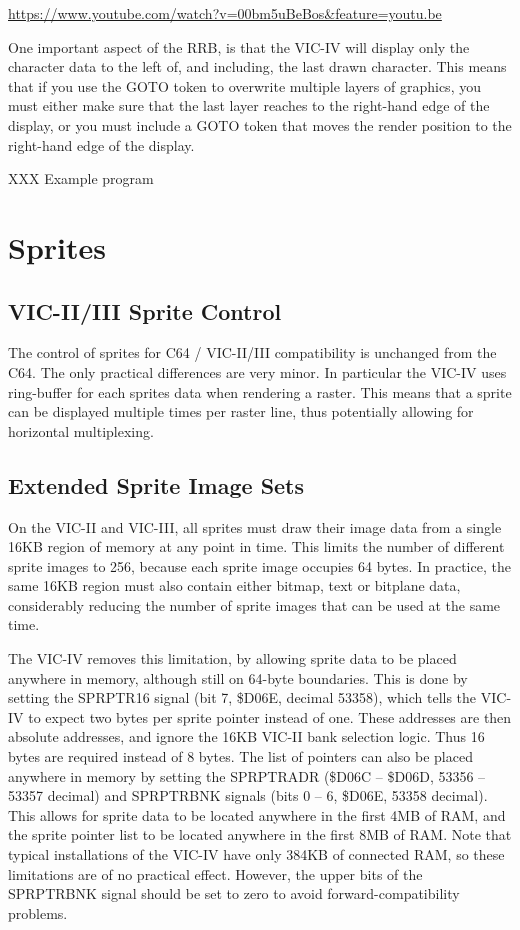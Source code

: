 \url{https://www.youtube.com/watch?v=00bm5uBeBos&feature=youtu.be}

One important aspect of the RRB, is that the VIC-IV will display only the character data to the left of, and including, the last drawn character.  This means that if you use the GOTO token to overwrite multiple layers of graphics, you must either make sure that the last layer
reaches to the right-hand edge of the display, or you must include a GOTO token that moves the render position to the right-hand edge of the display.


XXX Example program

\section{Sprites}

\subsection{VIC-II/III Sprite Control}

The control of sprites for C64 / VIC-II/III compatibility is unchanged from the C64.  The only practical differences are very minor.
In particular the VIC-IV uses ring-buffer for each sprites data when rendering a raster. This means that a sprite can be displayed multiple times per raster line, thus potentially allowing for horizontal multiplexing.

\subsection{Extended Sprite Image Sets}

On the VIC-II and VIC-III, all sprites must draw their image data from a single 16KB region of memory at any point in time.
This limits the number of different sprite images to 256, because each sprite image occupies 64 bytes.  In practice, the same
16KB region must also contain either bitmap, text or bitplane data, considerably reducing the number of sprite images that
can be used at the same time.

The VIC-IV removes this limitation, by allowing sprite data to be placed anywhere in memory, although still on 64-byte
boundaries. This is done by setting the SPRPTR16 signal (bit 7, \$D06E, decimal 53358), which tells the VIC-IV to expect
two bytes per sprite pointer instead of one.  These addresses are then absolute addresses, and ignore the 16KB VIC-II
bank selection logic.  Thus 16 bytes are required instead of 8 bytes.  The list of pointers can also be placed anywhere
in memory by setting the SPRPTRADR (\$D06C -- \$D06D, 53356 -- 53357 decimal) and SPRPTRBNK signals (bits 0 -- 6, \$D06E, 53358 decimal).
This allows for sprite data to be located anywhere in the first 4MB of RAM, and the sprite pointer list to be located anywhere
in the first 8MB of RAM.  Note that typical installations of the VIC-IV have only 384KB of connected RAM, so these limitations are
of no practical effect. However, the upper bits of the SPRPTRBNK signal should be set to zero to avoid forward-compatibility
problems.

